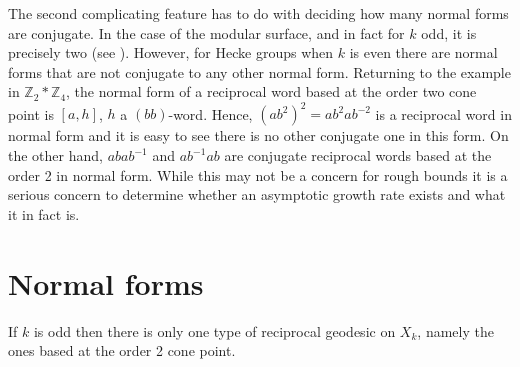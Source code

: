 \documentclass[11pt]{amsart}
\numberwithin{equation}{section}
\theoremstyle{plain}
\newtheorem{definition}[thm]{Definition}
\begin{document}
The second complicating feature has to do with 
deciding  how many normal forms are conjugate.
In the case of the  modular surface,  and in fact for $k$ odd,  it is precisely two  (see \cite{BasSuz, Mar}). 
However, for Hecke groups  when  $k$ 
is even there are  normal forms that are not conjugate to any other normal form.  Returning to the   example in 
 $\mathbb{Z}_{2} \ast  \mathbb{Z}_{4}$, the normal form of a reciprocal word based at the order two cone point is 
 $[a,h]$, $h$ a $(bb)$-word. Hence, 
$(ab^{2})^{2}=ab^2ab^{-2}$ is a reciprocal word in normal form and it is easy to see there is no other conjugate one in this form.   On the other hand,  $abab^{-1}$ and $ab^{-1}ab$ are conjugate  reciprocal words  based at the order 2  in normal form. While this may not be  a concern for rough bounds it is a serious concern to determine whether an asymptotic growth rate exists and what it in fact is. 





 
\section{Normal forms}\label{sec: normal forms}


If $k$ is odd then there is only one type of reciprocal geodesic 
on $X_{k}$, namely the ones based at the order 2 cone point. 

\end{document}
